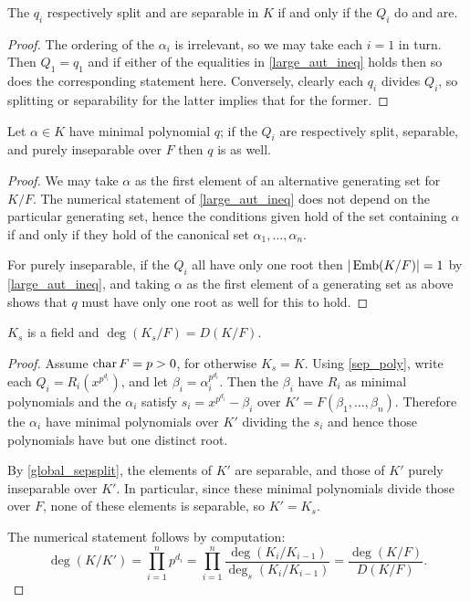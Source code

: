 \begin{corollary} The $q_i$ respectively split and are separable in $K$ if and only
if the $Q_i$ do and are.
\label{absolute_sepsplit}
\end{corollary}

\begin{proof} The ordering of the $\alpha_i$ is irrelevant, so we may take
each $i = 1$ in turn.  Then $Q_1 = q_1$ and if either of the equalities in
\ref{large_aut_ineq} holds then so does the corresponding statement here.
Conversely, clearly each $q_i$ divides $Q_i$, so splitting or separability
for the latter implies that for the former. \end{proof}

\begin{corollary} Let $\alpha \in K$ have minimal polynomial $q$; if the $Q_i$ are
respectively split, separable, and purely inseparable over $F$ then $q$ is as
well.
\label{global_sepsplit}
\end{corollary}

\begin{proof} We may take $\alpha$ as the first element of an alternative
generating set for $K/F$.  The numerical statement of \ref{large_aut_ineq}
does not depend on the particular generating set, hence the conditions given
hold of the set containing $\alpha$ if and only if they hold of the canonical
set ${\alpha_1, \dots, \alpha_n}$.

For purely inseparable, if the $Q_i$ all have only one root then $|\operatorname{\text{Emb}}(K/F)|
= 1$ by \ref{large_aut_ineq}, and taking $\alpha$ as the first element of a
generating set as above shows that $q$ must have only one root as well for
this to hold. \end{proof}

\begin{corollary} $K_s$ is a field and $\deg(K_s/F) = D(K/F)$.
\label{sep_subfield}
\end{corollary}

\begin{proof} Assume $\operatorname{\text{char}}{F} = p > 0$, for otherwise $K_s = K$.  Using
\ref{sep_poly}, write each $Q_i = R_i(x^{p^{d_i}})$, and let $\beta_i =
\alpha_i^{p^{d_i}}$.  Then the $\beta_i$ have $R_i$ as minimal polynomials and
the $\alpha_i$ satisfy $s_i = x^{p^{d_i}} - \beta_i$ over $K' = F(\beta_1,
\dots, \beta_n)$.  Therefore the $\alpha_i$ have minimal polynomials over $K'$
dividing the $s_i$ and hence those polynomials have but one distinct root.

By \ref{global_sepsplit}, the elements of $K'$ are separable, and those of
$K'$ purely inseparable over $K'$.  In particular, since these minimal
polynomials divide those over $F$, none of these elements is separable, so $K'
= K_s$.

The numerical statement follows by computation:
\begin{equation*}
\deg(K/K') = \prod_{i = 1}^n p^{d_i}
	= \prod_{i = 1}^n \frac{\deg(K_i/K_{i - 1})}{\deg_s(K_i/K_{i - 1})}
	= \frac{\deg(K/F)}{D(K/F)}. 
	\end{equation*}
\end{proof}

